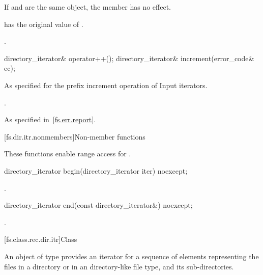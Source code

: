 \begin{itemdescr}
\pnum
\effects
If  and  are the same
  object, the member has no effect.

\pnum
\ensures
{} has the original value of .

\pnum
\returns
{}.
\end{itemdescr}

%
%
\begin{itemdecl}
directory_iterator& operator++();
directory_iterator& increment(error_code& ec);
\end{itemdecl}

\begin{itemdescr}
\pnum
\effects
As specified for the prefix increment operation of
Input iterators.

\pnum
\returns
{}.

\pnum
\throws
As specified in~\ref{fs.err.report}.
\end{itemdescr}

[fs.dir.itr.nonmembers]{Non-member functions}

\pnum
These functions enable range access for .

%
\begin{itemdecl}
directory_iterator begin(directory_iterator iter) noexcept;
\end{itemdecl}

\begin{itemdescr}
\pnum
\returns
{}.
\end{itemdescr}

%
\begin{itemdecl}
directory_iterator end(const directory_iterator&) noexcept;
\end{itemdecl}

\begin{itemdescr}
\pnum
\returns
{}.
\end{itemdescr}

[fs.class.rec.dir.itr]{Class }

%
\pnum
An object of type  provides an iterator for
a sequence of  elements representing the files in a
directory or in an  directory-like file
type, and its sub-directories.

